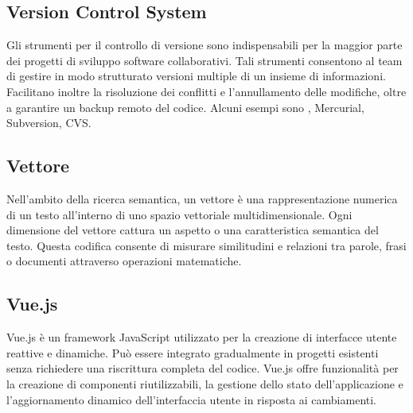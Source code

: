\vspace{2em}
\subsection*{Version Control System}
\par Gli strumenti per il controllo di versione sono indispensabili per la maggior parte dei progetti di sviluppo software collaborativi. Tali strumenti consentono al team di gestire in modo strutturato versioni multiple di un insieme di informazioni. Facilitano inoltre la risoluzione dei conflitti e l'annullamento delle modifiche, oltre a garantire un backup remoto del codice.
Alcuni esempi sono , Mercurial, Subversion, CVS.

\vspace{2em}
\subsection*{Vettore}
\par Nell’ambito della ricerca semantica, un vettore è una rappresentazione numerica di un testo all’interno di uno spazio vettoriale multidimensionale. Ogni dimensione del vettore cattura un aspetto o una caratteristica semantica del testo. Questa codifica consente di misurare similitudini e relazioni tra parole, frasi o documenti attraverso operazioni matematiche.

\vspace{2em}
\subsection*{Vue.js}
\par Vue.js è un framework JavaScript utilizzato per la creazione di interfacce utente reattive e dinamiche. Può essere integrato gradualmente in progetti esistenti senza richiedere una riscrittura completa del codice. Vue.js offre funzionalità per la creazione di componenti riutilizzabili, la gestione dello stato dell'applicazione e l'aggiornamento dinamico dell'interfaccia utente in risposta ai cambiamenti.
